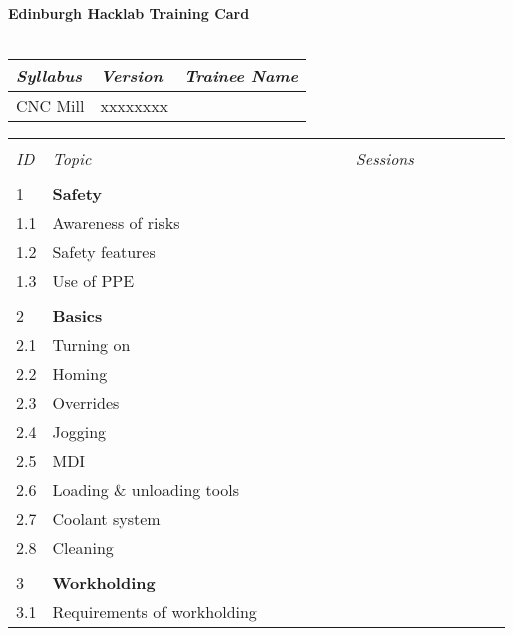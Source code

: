 \documentclass[a5paper]{article}
\begin{document}
\noindent
\textbf{Edinburgh Hacklab Training Card} \\
\\
\begin{tabularx}{\textwidth}{|l|l|X|}
\hline
\textit{Syllabus} & \textit{Version} & \textit{Trainee Name} \\
\hline
CNC Mill & xxxxxxxx & \\
\hline
\end{tabularx}
\begin{tabularx}{\textwidth}{|l|X|c|c|c|c|c|c|c|c|c|c|c|c|c|c|c|}
    \hline
    & & \multicolumn{15}{c|}{} \\
    \textit{ID} & \textit{Topic} & \multicolumn{15}{c|}{\textit{Sessions}} \\
    \hline
    & \multicolumn{16}{c|}{} \\
    \endhead
    1 & \multicolumn{1}{l}{\textbf{Safety}} & \multicolumn{15}{c|}{} \\
    \hline
    1.1 & Awareness of risks
    & & & & & & & & & & & & & & & \\ \hline
    1.2 & Safety features
    & & & & & & & & & & & & & & & \\ \hline
    1.3 & Use of PPE
    & & & & & & & & & & & & & & & \\ \hline
    & \multicolumn{16}{c|}{} \\
    2 & \multicolumn{1}{l}{\textbf{Basics}} & \multicolumn{15}{c|}{} \\
    \hline
    2.1 & Turning on
    & & & & & & & & & & & & & & & \\ \hline
    2.2 & Homing
    & & & & & & & & & & & & & & & \\ \hline
    2.3 & Overrides
    & & & & & & & & & & & & & & & \\ \hline
    2.4 & Jogging
    & & & & & & & & & & & & & & & \\ \hline
    2.5 & MDI
    & & & & & & & & & & & & & & & \\ \hline
    2.6 & Loading \& unloading tools
    & & & & & & & & & & & & & & & \\ \hline
    2.7 & Coolant system
    & & & & & & & & & & & & & & & \\ \hline
    2.8 & Cleaning
    & & & & & & & & & & & & & & & \\ \hline
    & \multicolumn{16}{c|}{} \\
    3 & \multicolumn{1}{l}{\textbf{Workholding}} & \multicolumn{15}{c|}{} \\
    \hline
    3.1 & Requirements of workholding
    & & & & & & & & & & & & & & & \\ \hline

\end{tabularx}
\end{document}
